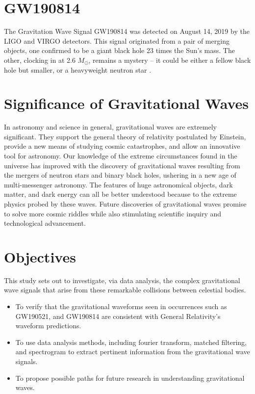 \section{GW190814}
The Gravitation Wave Signal GW190814 was detected on August 14, 2019 by the LIGO and VIRGO detectors. This signal originated from a pair of merging objects, one confirmed to be a giant black hole 23 times the Sun's mass. The other, clocking in at 2.6 $M_\odot$, remains a mystery – it could be either a fellow black hole but smaller, or a heavyweight neutron star \citep{abbott2020gw190814}.

\section{Significance of Gravitational Waves}
In astronomy and science in general, gravitational waves are extremely significant. They support the general theory of relativity postulated by Einstein, provide a new means of studying cosmic catastrophes, and allow an innovative tool for astronomy. Our knowledge of the extreme circumstances found in the universe has improved with the discovery of gravitational waves resulting from the mergers of neutron stars and binary black holes, ushering in a new age of multi-messenger astronomy. The features of huge astronomical objects, dark matter, and dark energy can all be better understood because to the extreme physics probed by these waves. Future discoveries of gravitational waves promise to solve more cosmic riddles while also stimulating scientific inquiry and technological advancement.
\section{Objectives}
This study sets out to investigate, via data analysis, the complex gravitational wave signals that arise from these remarkable collisions between celestial bodies.
\begin{itemize}
    \item  To verify that the gravitational waveforms seen in occurrences such as GW190521, and GW190814 are consistent with General Relativity's waveform predictions.
    \item  To use data analysis methods, including fourier transform, matched filtering, and  spectrogram to extract pertinent information from the gravitational wave signals.
    \item To propose possible paths for future research in understanding gravitational waves.
\end{itemize}
